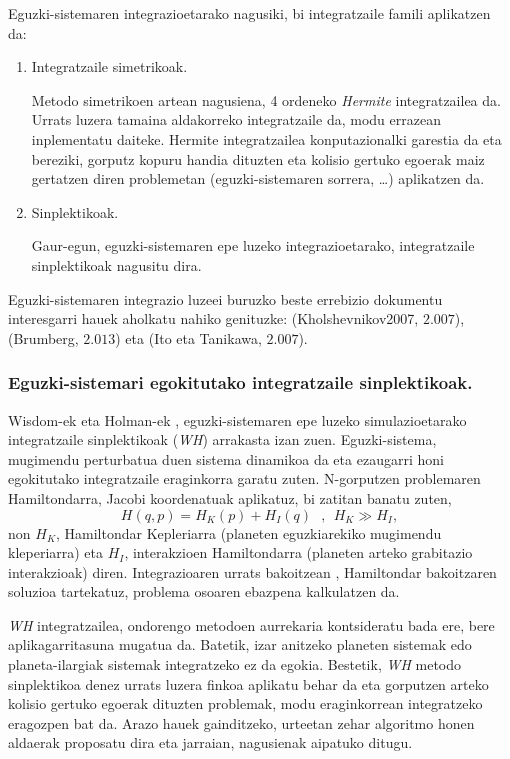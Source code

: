 Eguzki-sistemaren integrazioetarako nagusiki, bi integratzaile famili aplikatzen da: 
\begin{enumerate}
\item Integratzaile simetrikoak.

Metodo simetrikoen artean nagusiena, 4 ordeneko \emph{Hermite} \cite{Aarseth2008} integratzailea da.
Urrats luzera tamaina aldakorreko integratzaile da, modu errazean inplementatu daiteke.  Hermite integratzailea konputazionalki garestia da eta bereziki, gorputz kopuru handia dituzten eta kolisio gertuko egoerak maiz gertatzen diren problemetan (eguzki-sistemaren sorrera, \dots) aplikatzen da.  

\item Sinplektikoak.

Gaur-egun, eguzki-sistemaren epe luzeko integrazioetarako, integratzaile sinplektikoak nagusitu dira. 

\end{enumerate}

Eguzki-sistemaren integrazio luzeei buruzko beste errebizio dokumentu interesgarri hauek aholkatu nahiko genituzke: \cite{Kholshevnikov2007} (Kholshevnikov2007, $2.007$), \cite{Brumberg2013} (Brumberg, $2.013$) eta  \cite{Ito2007} (Ito eta Tanikawa, $2.007$).  
 


\subsubsection*{Eguzki-sistemari egokitutako integratzaile sinplektikoak.}

Wisdom-ek eta Holman-ek \cite[1991]{Sussman1992}, eguzki-sistemaren epe luzeko simulazioetarako integratzaile  sinplektikoak (\emph{WH}) arrakasta izan zuen. Eguzki-sistema, mugimendu perturbatua duen sistema dinamikoa da eta ezaugarri honi egokitutako integratzaile eraginkorra garatu zuten. N-gorputzen problemaren Hamiltondarra,  Jacobi koordenatuak  aplikatuz, bi zatitan banatu zuten,
\begin{equation*}
H(q,p)=H_K(p)+H_I(q) \ \ \ , \ \ H_K\gg H_I,
\end{equation*}
non $H_K$, Hamiltondar Kepleriarra (planeten eguzkiarekiko mugimendu kleperiarra) eta $H_I$, interakzioen Hamiltondarra (planeten arteko grabitazio interakzioak) diren. Integrazioaren urrats bakoitzean , Hamiltondar bakoitzaren soluzioa tartekatuz, problema osoaren ebazpena kalkulatzen da.  

\emph{WH} integratzailea, ondorengo metodoen aurrekaria kontsideratu bada ere, bere aplikagarritasuna mugatua da. Batetik, izar anitzeko planeten sistemak edo planeta-ilargiak sistemak integratzeko ez da egokia. Bestetik, \emph{WH} metodo sinplektikoa denez urrats luzera finkoa aplikatu behar da eta gorputzen arteko kolisio gertuko egoerak dituzten problemak, modu eraginkorrean integratzeko eragozpen bat da. Arazo hauek gainditzeko, urteetan zehar algoritmo honen aldaerak proposatu dira eta jarraian, nagusienak aipatuko ditugu. 

